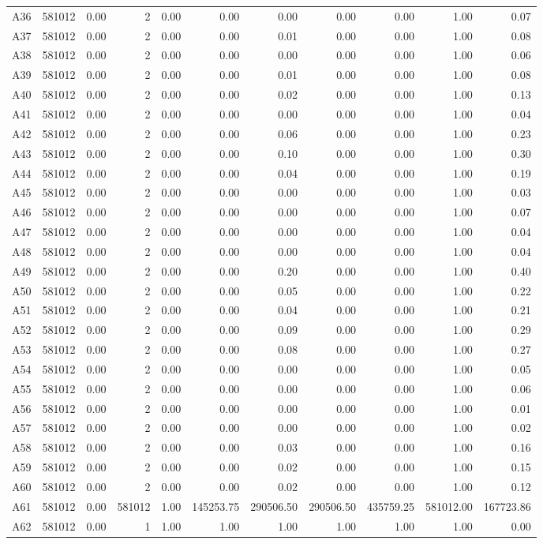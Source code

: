 \documentclass[11pt]{report}
\begin{document}
\begin{table}[H]
{\begin{tabular}{lrrrrrrrrrr}
A36 & 581012 & 0.00 & 2 & 0.00 & 0.00 & 0.00 & 0.00 & 0.00 & 1.00 & 0.07 \\
A37 & 581012 & 0.00 & 2 & 0.00 & 0.00 & 0.01 & 0.00 & 0.00 & 1.00 & 0.08 \\
A38 & 581012 & 0.00 & 2 & 0.00 & 0.00 & 0.00 & 0.00 & 0.00 & 1.00 & 0.06 \\
A39 & 581012 & 0.00 & 2 & 0.00 & 0.00 & 0.01 & 0.00 & 0.00 & 1.00 & 0.08 \\
A40 & 581012 & 0.00 & 2 & 0.00 & 0.00 & 0.02 & 0.00 & 0.00 & 1.00 & 0.13 \\
A41 & 581012 & 0.00 & 2 & 0.00 & 0.00 & 0.00 & 0.00 & 0.00 & 1.00 & 0.04 \\
A42 & 581012 & 0.00 & 2 & 0.00 & 0.00 & 0.06 & 0.00 & 0.00 & 1.00 & 0.23 \\
A43 & 581012 & 0.00 & 2 & 0.00 & 0.00 & 0.10 & 0.00 & 0.00 & 1.00 & 0.30 \\
A44 & 581012 & 0.00 & 2 & 0.00 & 0.00 & 0.04 & 0.00 & 0.00 & 1.00 & 0.19 \\
A45 & 581012 & 0.00 & 2 & 0.00 & 0.00 & 0.00 & 0.00 & 0.00 & 1.00 & 0.03 \\
A46 & 581012 & 0.00 & 2 & 0.00 & 0.00 & 0.00 & 0.00 & 0.00 & 1.00 & 0.07 \\
A47 & 581012 & 0.00 & 2 & 0.00 & 0.00 & 0.00 & 0.00 & 0.00 & 1.00 & 0.04 \\
A48 & 581012 & 0.00 & 2 & 0.00 & 0.00 & 0.00 & 0.00 & 0.00 & 1.00 & 0.04 \\
A49 & 581012 & 0.00 & 2 & 0.00 & 0.00 & 0.20 & 0.00 & 0.00 & 1.00 & 0.40 \\
A50 & 581012 & 0.00 & 2 & 0.00 & 0.00 & 0.05 & 0.00 & 0.00 & 1.00 & 0.22 \\
A51 & 581012 & 0.00 & 2 & 0.00 & 0.00 & 0.04 & 0.00 & 0.00 & 1.00 & 0.21 \\
A52 & 581012 & 0.00 & 2 & 0.00 & 0.00 & 0.09 & 0.00 & 0.00 & 1.00 & 0.29 \\
A53 & 581012 & 0.00 & 2 & 0.00 & 0.00 & 0.08 & 0.00 & 0.00 & 1.00 & 0.27 \\
A54 & 581012 & 0.00 & 2 & 0.00 & 0.00 & 0.00 & 0.00 & 0.00 & 1.00 & 0.05 \\
A55 & 581012 & 0.00 & 2 & 0.00 & 0.00 & 0.00 & 0.00 & 0.00 & 1.00 & 0.06 \\
A56 & 581012 & 0.00 & 2 & 0.00 & 0.00 & 0.00 & 0.00 & 0.00 & 1.00 & 0.01 \\
A57 & 581012 & 0.00 & 2 & 0.00 & 0.00 & 0.00 & 0.00 & 0.00 & 1.00 & 0.02 \\
A58 & 581012 & 0.00 & 2 & 0.00 & 0.00 & 0.03 & 0.00 & 0.00 & 1.00 & 0.16 \\
A59 & 581012 & 0.00 & 2 & 0.00 & 0.00 & 0.02 & 0.00 & 0.00 & 1.00 & 0.15 \\
A60 & 581012 & 0.00 & 2 & 0.00 & 0.00 & 0.02 & 0.00 & 0.00 & 1.00 & 0.12 \\
A61 & 581012 & 0.00 & 581012 & 1.00 & 145253.75 & 290506.50 & 290506.50 & 435759.25 & 581012.00 & 167723.86 \\
A62 & 581012 & 0.00 & 1 & 1.00 & 1.00 & 1.00 & 1.00 & 1.00 & 1.00 & 0.00 \\
\bottomrule
\end{tabular}
}
\end{table}
\end{document}

